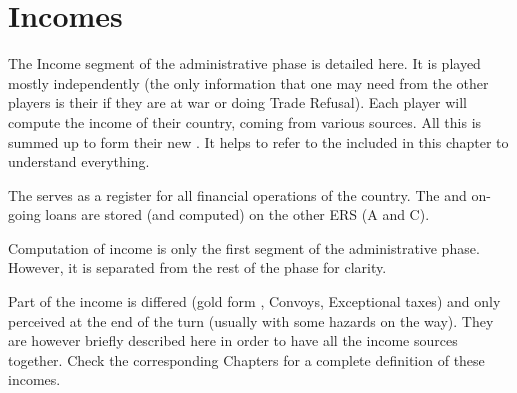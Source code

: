 \chapter{Incomes}\label{chapter:Incomes}
\aparag[Overview] 
The Income segment of the administrative phase is detailed here. It is
played mostly independently (the only information that one may need from
the other players is their  if they are at war
or doing Trade Refusal). Each player will compute the income of their
country, coming from various sources.%
All this is summed up to form their new \RT. It helps to refer to the
 included in this chapter to understand
everything.

The  serves as a register for all
financial operations of the country. The \RT and on-going loans are
stored (and computed) on the other ERS (A and C).

Computation of income is only the first segment of the administrative
phase. However, it is separated from the rest of the phase for clarity.

Part of the income is differed (gold form \ROTW, Convoys, Exceptional
taxes) and only perceived at the end of the turn (usually with some
hazards on the way). They are however briefly described here in order to
have all the income sources together. Check the corresponding Chapters
for a complete definition of these incomes.



